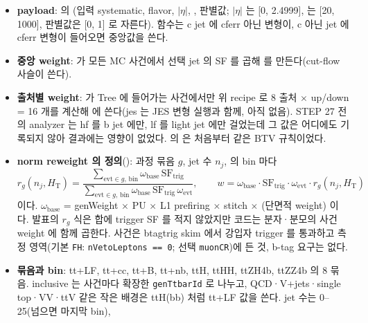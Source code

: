 \begin{itemize}
\item \textbf{payload}:  의 (입력 systematic, flavor, $|\eta|$, \pt, 판별값; $|\eta|$ 는
  [0, 2.4999], \pt{} 는 [20, 1000]\GeV, 판별값은 [0, 1] 로 자른다). 함수는 c jet 에 cferr 아닌 변형이, c 아닌 jet 에 cferr 변형이 들어오면 중앙값을
  쓴다\tagimpl.
\item \textbf{중앙 weight}:  가 모든 MC 사건에서 선택 jet 의 SF 를 곱해  를 만든다(cut-flow 사슬이
  쓴다)\tagimpl.
\item \textbf{출처별 weight}:  가 Tree 에 들어가는 사건에서만 위 recipe 로 8 출처 $\times$ up/down = 16 개를
  계산해  에 쓴다(jes 는 JES 변형 실행과 함께, 아직 없음). STEP 27 전의 analyzer 는 hf 를 b jet 에만, lf 를
  light jet 에만 걸었는데 그 값은 어디에도 기록되지 않아 결과에는 영향이 없었다.  의
   은 처음부터 같은 BTV 규칙이었다\tagimpl\tagtest.
\item \textbf{norm reweight 의 정의}(): 과정 묶음 $g$, jet 수 $n_j$, \HT{} 의 bin 마다
  \begin{equation}
    r_g(n_j, H_\mathrm{T}) = \frac{\sum_{\text{evt}\in g,\,\text{bin}} \omega_\text{base}\,\mathrm{SF}_\text{trig}}{\sum_{\text{evt}\in g,\,\text{bin}} \omega_\text{base}\,\mathrm{SF}_\text{trig}\,\omega_\text{evt}},
    \qquad
    w = \omega_\text{base}\cdot\mathrm{SF}_\text{trig}\cdot\omega_\text{evt}\cdot r_g(n_j, H_\mathrm{T})
    \label{eq:btag-normrw}
  \end{equation}
  이다. $\omega_\text{base}$ = genWeight $\times$ PU $\times$ L1 prefiring $\times$ stitch $\times$ (단면적 weight)
  이다. 발표의 $r_g$ 식은 합에 trigger SF 를 적지 않았지만 코드는 분자·분모의 사건 weight 에 함께 곱한다. 사건은 btagtrig skim 에서 강입자 trigger 를
  통과하고 측정 영역(기본 \texttt{FH}: \texttt{nVetoLeptons == 0}; 선택 \texttt{muonCR})에 든 것, b-tag 요구는 없다\tagimpl.
\item \textbf{묶음과 bin}: tt+LF, tt+cc, tt+B, tt+nb, ttH, ttHH, ttZH4b, ttZZ4b 의 8 묶음. inclusive \ttbar{} 는 사건마다 확장한
  \texttt{genTtbarId} 로 나누고, QCD·V+jets·single top·VV·ttV 같은 작은 배경은 ttH(bb) 처럼 tt+LF 값을 쓴다. jet 수는 0–25(넘으면 마지막 bin),

\end{itemize}
